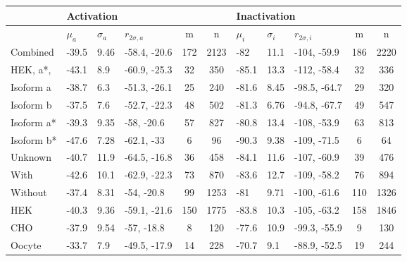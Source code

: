\begin{tabular}{l | lll | cc | lll | cc}
\hline
\multicolumn{1}{l|}{} & \multicolumn{5}{l|}{Activation} & \multicolumn{5}{l}{Inactivation} \\ \hline
{} & $\mu_a$ & $\sigma_a$ & $r_{2\sigma,a}$ & m & n
   & $\mu_i$ & $\sigma_i$ & $r_{2\sigma,i}$ & m & n \\ \hline
Combined & -39.5 & 9.46 & -58.4, -20.6 & 172 & 2123 & -82 & 11.1 & -104, -59.9 & 186 & 2220 \\
HEK, a*, \bet1 & -43.1 & 8.9 & -60.9, -25.3 & 32 & 350 & -85.1 & 13.3 & -112, -58.4 & 32 & 336 \\
\hline
Isoform a & -38.7 & 6.3 & -51.3, -26.1 & 25 & 240 & -81.6 & 8.45 & -98.5, -64.7 & 29 & 320 \\
Isoform b & -37.5 & 7.6 & -52.7, -22.3 & 48 & 502 & -81.3 & 6.76 & -94.8, -67.7 & 49 & 547 \\
Isoform a* & -39.3 & 9.35 & -58, -20.6 & 57 & 827 & -80.8 & 13.4 & -108, -53.9 & 63 & 813 \\
Isoform b* & -47.6 & 7.28 & -62.1, -33 & 6 & 96 & -90.3 & 9.38 & -109, -71.5 & 6 & 64 \\
Unknown & -40.7 & 11.9 & -64.5, -16.8 & 36 & 458 & -84.1 & 11.6 & -107, -60.9 & 39 & 476 \\
\hline
With \bet1 & -42.6 & 10.1 & -62.9, -22.3 & 73 & 870 & -83.6 & 12.7 & -109, -58.2 & 76 & 894 \\
Without \bet1 & -37.4 & 8.31 & -54, -20.8 & 99 & 1253 & -81 & 9.71 & -100, -61.6 & 110 & 1326 \\
\hline
HEK & -40.3 & 9.36 & -59.1, -21.6 & 150 & 1775 & -83.8 & 10.3 & -105, -63.2 & 158 & 1846 \\
CHO & -37.9 & 9.54 & -57, -18.8 & 8 & 120 & -77.6 & 10.9 & -99.3, -55.9 & 9 & 130 \\
Oocyte & -33.7 & 7.9 & -49.5, -17.9 & 14 & 228 & -70.7 & 9.1 & -88.9, -52.5 & 19 & 244 \\
\hline
\end{tabular}
